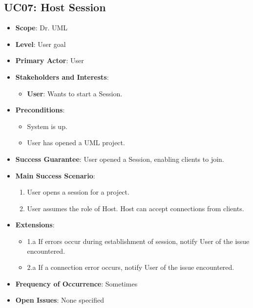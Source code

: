 \documentclass[12pt]{article}
\begin{document}
\subsection{UC07: Host Session}
\begin{itemize}
    \item \textbf{Scope}: Dr. UML
    \item \textbf{Level}: User goal
    \item \textbf{Primary Actor}: User
    \item \textbf{Stakeholders and Interests}:
    \begin{itemize}
        \item \textbf{User}: Wants to start a Session.
    \end{itemize}
    \item \textbf{Preconditions}:
    \begin{itemize}
        \item System is up.
        \item User has opened a UML project.
    \end{itemize}
    \item \textbf{Success Guarantee}: User opened a Session, enabling clients to join.
    \item \textbf{Main Success Scenario}:
    \begin{enumerate}
        \item User opens a session for a project.
        \item User assumes the role of Host. Host can accept connections from clients.
    \end{enumerate}
    \item \textbf{Extensions}:
    \begin{itemize}
        \item 1.a If errors occur during establishment of session, notify User of the issue encountered.
        \item 2.a If a connection error occurs, notify User of the issue encountered.
    \end{itemize}
    \item \textbf{Frequency of Occurrence}: Sometimes
    \item \textbf{Open Issues}: None specified
\end{itemize}
\end{document}
